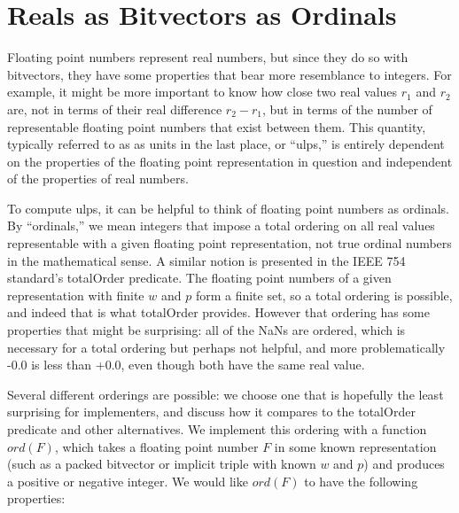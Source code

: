 \documentclass[letterpaper,10pt]{article}
\begin{document}
\section{Reals as Bitvectors as Ordinals}

Floating point numbers represent real numbers, but since they do so with bitvectors, they have some properties that bear more resemblance to integers. For example, it might be more important to know how close two real values $r_1$ and $r_2$ are, not in terms of their real difference $r_2 - r_1$, but in terms of the number of representable floating point numbers that exist between them. This quantity, typically referred to as as units in the last place, or ``ulps,'' is entirely dependent on the properties of the floating point representation in question and independent of the properties of real numbers.

To compute ulps, it can be helpful to think of floating point numbers as ordinals. By ``ordinals,'' we mean integers that impose a total ordering on all real values representable with a given floating point representation, not true ordinal numbers in the mathematical sense. A similar notion is presented in the IEEE 754 standard's totalOrder predicate. The floating point numbers of a given representation with finite $w$ and $p$ form a finite set, so a total ordering is possible, and indeed that is what totalOrder provides. However that ordering has some properties that might be surprising: all of the NaNs are ordered, which is necessary for a total ordering but perhaps not helpful, and more problematically -0.0 is less than +0.0, even though both have the same real value.

Several different orderings are possible: we choose one that is hopefully the least surprising for implementers, and discuss how it compares to the totalOrder predicate and other alternatives. We implement this ordering with a function $ord(F)$, which takes a floating point number $F$ in some known representation (such as a packed bitvector or implicit triple with known $w$ and $p$) and produces a positive or negative integer. We would like $ord(F)$ to have the following properties:
\end{document}
